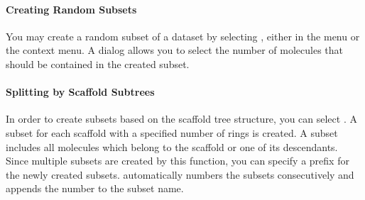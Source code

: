 \paragraph{Creating Random Subsets}
You may create a random subset of a dataset by selecting , either in the  menu or the context menu. A dialog allows you to select the number of molecules that should be contained in the created subset.

\paragraph{Splitting by Scaffold Subtrees}
In order to create subsets based on the scaffold tree structure, you can select . A subset for each scaffold with a specified number of rings is created. A subset includes all molecules which belong to the scaffold or one of its descendants. Since multiple subsets are created by this function, you can specify a prefix for the newly created subsets. \sh automatically numbers the subsets consecutively and appends the number to the subset name.